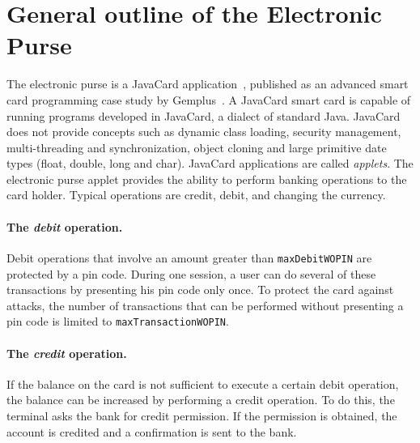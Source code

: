 \documentclass[a4paper]{llncs}
\begin{document}
\section{General outline of the Electronic Purse}
\label{SectGenPurse}

The electronic purse is a JavaCard application~\cite{JavaCardURL}, published
as an advanced smart card programming case study by
Gemplus~\cite{PurseUrl}. A JavaCard smart card is capable of running
programs developed in {JavaCard}, a dialect of
standard Java. {JavaCard} does not provide concepts such as dynamic
class loading, security management, multi-threading and
synchronization, object cloning and large primitive date types (float,
double, long and char).  JavaCard applications are called
\emph{applets}.  The electronic purse applet provides  the ability to 
perform banking operations to the card holder. Typical operations are
credit, debit, and changing the currency.

\paragraph{\bf The \textit{debit} operation.} 
Debit operations that involve an amount greater than
\texttt{maxDebitWOPIN} are protected by a pin code. During one session, 
a user can do several of these transactions by presenting his pin code
only once. To protect the card against attacks, the number of
transactions that can be performed without presenting a pin code is
limited to \texttt{maxTransactionWOPIN}.




\paragraph{\bf The \textit{credit} operation.} 
If the balance on the card is not sufficient to execute a certain debit
operation, the balance can be increased by performing a credit
operation. To do this, the terminal asks the bank for credit
permission. If the permission is obtained, the account is credited and 
a confirmation is sent to the bank.
\end{document}

